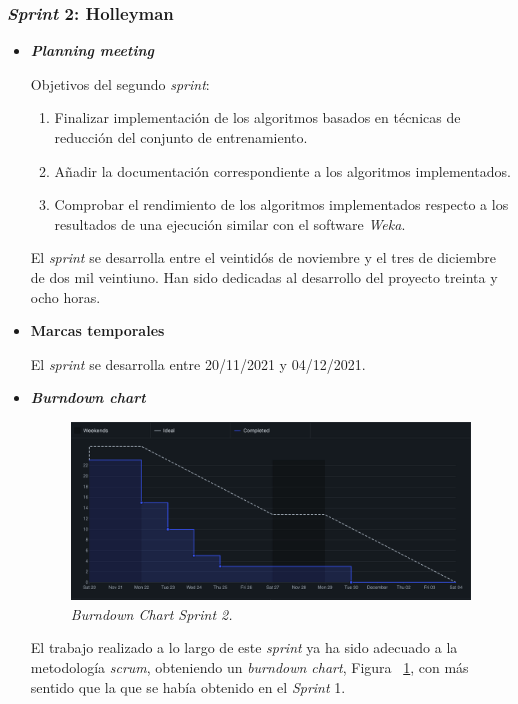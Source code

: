 \subsubsection{\textit{Sprint} 2: Holleyman}
\begin{itemize}
\item \textbf{\textit{Planning meeting}}

Objetivos del segundo \textit{sprint}:
\begin{enumerate}
\item Finalizar implementación de los algoritmos basados en técnicas de reducción del conjunto de entrenamiento.
\item Añadir la documentación correspondiente a los algoritmos implementados.
\item Comprobar el rendimiento de los algoritmos implementados respecto a los resultados de una ejecución similar con el software \textit{Weka}.
\end{enumerate}
El \textit{sprint} se desarrolla entre el veintidós de noviembre y el tres de diciembre de dos mil veintiuno. Han sido dedicadas al desarrollo del proyecto treinta y ocho horas.

\item \textbf{Marcas temporales}

El \textit{sprint} se desarrolla entre 20/11/2021 y 04/12/2021.

\item \textbf{\textit{Burndown chart}}
\begin{figure}
\begin{center}
\includegraphics[width=\textwidth]{../img/anexos/sprints/BD-Sprint2}
\caption{\textit{Burndown Chart Sprint 2.}}\label{fig:BD-Sprint2}
\end{center}
\end{figure}

El trabajo realizado a lo largo de este \textit{sprint} ya ha sido adecuado a la metodología \textit{scrum}, obteniendo un \textit{burndown chart}, Figura ~\ref{fig:BD-Sprint2}, con más sentido que la que se había obtenido en el \textit{Sprint } 1. 


\end{itemize}
